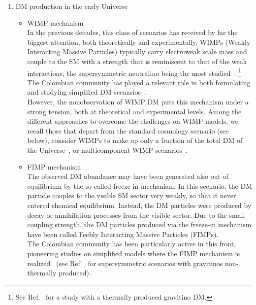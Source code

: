 \documentclass[a4paper,11pt]{article}
\begin{document}
\begin{enumerate}
\item 
DM production in the early Universe
\begin{itemize}
\item 
WIMP mechanism\\
In the previous decades, this class of scenarios has received by far the biggest attention, both theoretically and experimentally. WIMPs (Weakly Interacting Massive Particles) typically carry electroweak scale mass and couple to the SM with a strength that is reminiscent to that of the weak interactions; the supersymmetric neutralino being the most studied~\cite{Masiero:2004vk, Profumo:2004at, Bernal:2007uv, Sierra:2009zq, Bernal:2009jc}.%
\footnote{See Ref.~\cite{Hirsch:2005ag} for a study with a thermally produced gravitino DM.}
The Colombian community has played a relevant role in both formulating and studying simplified DM scenarios~\cite{Yaguna:2008hd, Goudelis:2009zz, Honorez:2010re, LopezHonorez:2010tb, Alvares:2012qv, Esch:2013rta, ochoa, martinezg2, nisperuza, martinez, Arbelaez:2015ila, Horiuchi:2016tqw, Dutta:2017lny, Arbelaez:2017ptu}.\\
However, the nonobservation of WIMP DM puts this mechanism under a strong tension, both at theoretical and experimental levels. Among the different approaches to overcome the challenges on WIMP models, we recall those that depart from the standard cosmology scenario (see below), consider WIMPs to make up only a fraction of the total DM of the Universe~\cite{Betancur:2018xtj, Carvajal:2018ohk}, or multicomponent WIMP scenarios~\cite{Esch:2014jpa, Bernal:2018aon, Yaguna:2019cvp, Belanger:2020hyh}. 
\item
FIMP mechanism\\
The observed DM abundance may have been generated also out of equilibrium by the so-called freeze-in mechanism. In this scenario, the DM particle couples to the visible SM sector very weakly, so that it never entered chemical equilibrium. Instead, the DM particles were produced by decay or annihilation processes from the visible sector. Due to the small coupling strength, the DM particles produced via the freeze-in mechanism have been called Feebly Interacting Massive Particles (FIMPs).\\
The Colombian community has been particularly active in this front, pioneering studies on simplified models where the FIMP mechanism is realized~\cite{Yaguna:2011qn, Molinaro:2014lfa, Bernal:2018ins, Bernal:2018kcw} (see Ref.~\cite{Choi:2010jt,Restrepo:2011rj} for supersymmetric scenarios with gravitinos non-thermally produced).

\end{itemize}
\end{enumerate}
\end{document}

